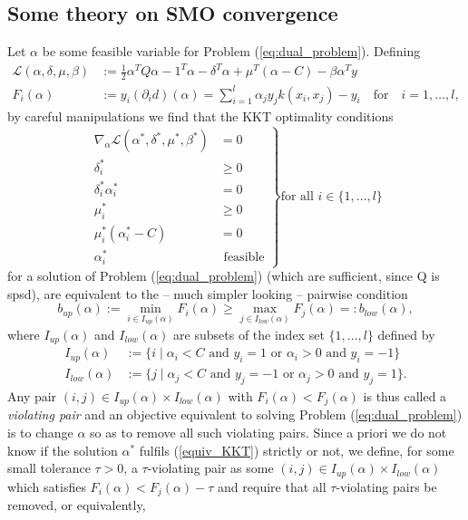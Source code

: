 \subsection{Some theory on SMO convergence}
Let $\alpha$ be some feasible variable for Problem (\ref{eq:dual_problem}). Defining
\begin{align*}
\mathcal{L}(\alpha,\delta,\mu,\beta) &:= \frac{1}{2} \alpha^T Q \alpha - 1^T \alpha - \delta^T\alpha + \mu^T(\alpha - C) - \beta \alpha^T y \\
F_i(\alpha) &:= y_i (\partial_i d)(\alpha) = \sum_{i = 1}^l \alpha_j y_j k(x_i,x_j) - y_i \quad \text{for} \quad i = 1,\ldots,l,
\end{align*}
by careful manipulations we find that the KKT optimality conditions
\begin{equation*}
\left.
\begin{aligned}
\nabla_{\alpha} \mathcal{L}(\alpha^*,\delta^*,\mu^*,\beta^*) &= 0\\
\delta_i^* &\geq 0\\
\delta_i^* \alpha_i^* &= 0\\
\mu_i^* &\geq 0\\
\mu_i^* (\alpha_i^*-C) &= 0\\
\alpha_i^* &\text{ feasible}
\end{aligned}
\right\} \text{for all } i \in \{1,\ldots,l\}
\end{equation*}
for a solution of Problem (\ref{eq:dual_problem}) (which are sufficient, since Q is spsd), are equivalent to the -- much simpler looking -- pairwise condition
\begin{equation*}\label{equiv_KKT}
b_{up}(\alpha) := \min_{i \in I_{up}(\alpha)} F_i(\alpha) \geq \max_{j \in I_{low}(\alpha)} F_j(\alpha) =: b_{low}(\alpha),
\end{equation*}
where $I_{up}(\alpha)$ and $I_{low}(\alpha)$ are subsets of the index set $\{1,\ldots,l\}$ defined by
\begin{align*}
I_{up}(\alpha) &:= \{ i  \mid  \alpha_i < C \text{ and } y_i = 1 \text{ or } \alpha_i > 0 \text{ and } y_i = -1 \} \\
I_{low}(\alpha) &:= \{ j \mid \alpha_j < C \text{ and } y_j = -1 \text{ or } \alpha_j > 0 \text{ and } y_j = 1 \}.
\end{align*} 
Any pair $(i,j) \in I_{up}(\alpha) \times I_{low}(\alpha)$ with $F_i(\alpha) < F_j(\alpha)$ is thus called a \textit{violating pair} and an objective equivalent to solving Problem (\ref{eq:dual_problem}) is to change $\alpha$ so as to remove all such violating pairs. Since a priori we do not know if the solution $\alpha^*$ fulfils (\ref{equiv_KKT}) strictly or not, we define, for some small tolerance $\tau > 0$, a $\tau$-violating pair as some $(i,j) \in I_{up}(\alpha) \times I_{low}(\alpha)$ which satisfies $F_i(\alpha) < F_j(\alpha) - \tau$ and require that all $\tau$-violating pairs be removed, or equivalently, 
